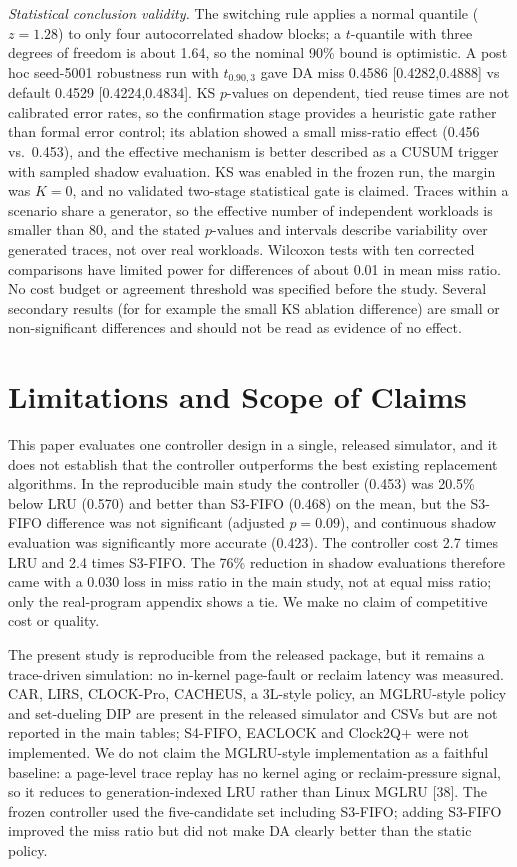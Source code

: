 \documentclass[10pt,twocolumn,a4paper]{IEEEtran}
\begin{document}
\emph{Statistical conclusion validity.} The switching rule applies a normal
quantile ($z = 1.28$) to only four autocorrelated shadow blocks; a
$t$-quantile with three degrees of freedom is about 1.64, so the nominal 90\%
bound is optimistic. A post hoc seed-5001 robustness run with
$t_{0.90,3}$ gave DA miss 0.4586 [0.4282,0.4888] vs default 0.4529
[0.4224,0.4834]. KS $p$-values on dependent, tied reuse times are not calibrated error rates,
so the confirmation stage provides a heuristic gate rather than formal error
control; its ablation showed a small miss-ratio effect (0.456 vs.\ 0.453), and
the effective mechanism is better described as a CUSUM trigger with sampled
shadow evaluation. KS was enabled in the frozen run, the margin was $K = 0$, and no
validated two-stage statistical gate is claimed. Traces within a scenario share a generator,
so the effective number of independent workloads is smaller than 80, and the
stated $p$-values and intervals describe variability over generated traces,
not over real workloads. Wilcoxon tests with ten corrected comparisons have
limited power for differences of about 0.01 in mean miss ratio. No cost budget or agreement threshold was specified before the study. Several secondary results (for
for example the small KS ablation difference) are small or non-significant
differences and should not be read as evidence of no effect.

\section{Limitations and Scope of Claims}
\label{sec:limits}

This paper evaluates one controller design in a single, released simulator,
and it does not establish that the controller outperforms the best existing
replacement algorithms. In the reproducible main study the controller (0.453)
was 20.5\% below LRU (0.570) and better than S3-FIFO (0.468) on the mean, but
the S3-FIFO difference was not significant (adjusted $p = 0.09$), and
continuous shadow evaluation was significantly more accurate (0.423). The
controller cost 2.7 times LRU and 2.4 times S3-FIFO. The 76\% reduction in
shadow evaluations therefore came with a 0.030 loss in miss ratio in the main
study, not at equal miss ratio; only the real-program appendix shows a tie. We
make no claim of competitive cost or quality.

The present study is reproducible from the released package, but it remains a
trace-driven simulation: no in-kernel page-fault or reclaim latency was measured. CAR,
LIRS, CLOCK-Pro, CACHEUS, a 3L-style policy, an MGLRU-style policy and
set-dueling DIP are present in the released simulator and CSVs but are not
reported in the main tables; S4-FIFO, EACLOCK and Clock2Q+ were not implemented.
We do not claim the MGLRU-style implementation as a faithful baseline: a
page-level trace replay has no kernel aging or reclaim-pressure signal, so it
reduces to generation-indexed LRU rather than Linux MGLRU [38]. The frozen
controller used the five-candidate set including S3-FIFO; adding S3-FIFO
improved the miss ratio but did not make DA clearly better than the static
policy.
\end{document}
